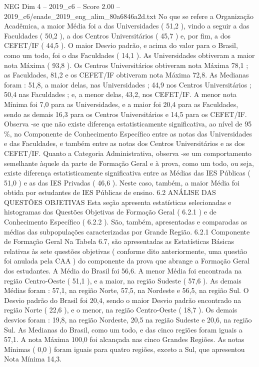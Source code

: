 \begin{textsample}{NEG Dim 4 – 2019\_c6 – Score 2.00 – 2019\_c6/enade\_2019\_eng\_alim\_80a6846a2d.txt}
No que se refere a Organização Acadêmica, a maior Média foi a das Universidades ( 51,2 ), vindo a seguir a das Faculdades ( 50,2 ), a dos Centros Universitários ( 45,7 ) e, por fim, a dos CEFET/IF ( 44,5 ).
O maior Desvio padrão, e acima do valor para o Brasil, como um todo, foi o das Faculdades ( 14,1 ).
As Universidades obtiveram a maior nota Máxima ( 93,8 ).
Os Centros Universitários obtiveram nota Máxima 78,1 ; as Faculdades, 81,2 e os CEFET/IF obtiveram nota Máxima 72,8.
As Medianas foram : 51,8, a maior delas, nas Universidades ; 44,9 nos Centros Universitários ; 50,4 nas Faculdades ; e, a menor delas, 43,2, nos CEFET/IF.
A menor nota Mínima foi 7,0 para as Universidades, e a maior foi 20,4 para as Faculdades, sendo as demais 16,3 para os Centros Universitários e 14,5 para os CEFET/IF.
Observa -se que não existe diferença estatisticamente significativa, ao nível de 95 \%, no Componente de Conhecimento Específico entre as notas das Universidades e das Faculdades, e também entre as notas dos Centros Universitários e as dos CEFET/IF.
Quanto a Categoria Administrativa, observa -se um comportamento semelhante àquele da parte de Formação Geral e à prova, como um todo, ou seja, existe diferença estatisticamente significativa entre as Médias das IES Públicas ( 51,0 ) e as das IES Privadas ( 46,6 ).
Neste caso, também, a maior Média foi obtida por estudantes de IES Públicas de ensino. 6.2 ANÁLISE DAS QUESTÕES OBJETIVAS Esta seção apresenta estatísticas selecionadas e histogramas das Questões Objetivas de Formação Geral ( 6.2.1 ) e de Conhecimento Específico ( 6.2.2 ).
São, também, apresentadas e comparadas as médias das subpopulações caracterizadas por Grande Região. 6.2.1 Componente de Formação Geral Na Tabela 6.7, são apresentadas as Estatísticas Básicas relativas às sete questões objetivas ( conforme dito anteriormente, uma questão foi anulada pela CAA ) do componente da prova que abrange a Formação Geral dos estudantes.
A Média do Brasil foi 56,6.
A menor Média foi encontrada na região Centro-Oeste ( 51,1 ), e a maior, na região Sudeste ( 57,6 ).
As demais Médias foram : 57,1, na região Norte, 57,5, na Nordeste e 56,5, na região Sul.
O Desvio padrão do Brasil foi 20,4, sendo o maior Desvio padrão encontrado na região Norte ( 22,6 ), e o menor, na região Centro-Oeste ( 18,7 ).
Os demais desvios foram : 19,8, na região Nordeste, 20,5 na região Sudeste e 20,6, na região Sul.
As Medianas do Brasil, como um todo, e das cinco regiões foram iguais a 57,1.
A nota Máxima 100,0 foi alcançada nas cinco Grandes Regiões.
As notas Mínimas ( 0,0 ) foram iguais para quatro regiões, exceto a Sul, que apresentou Nota Mínima 14,3.

\end{textsample}
